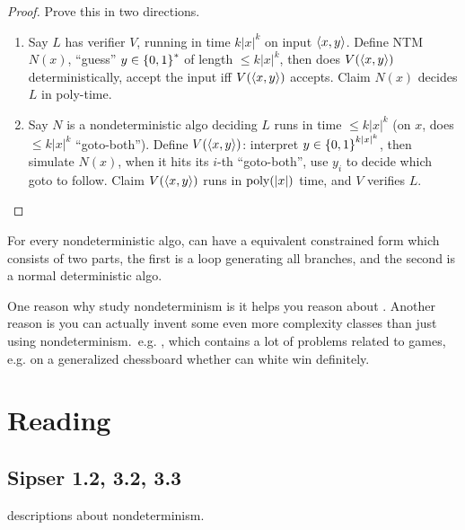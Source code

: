 \documentclass{article}
\begin{document}
\begin{proof}
  Prove this in two directions.
  \begin{enumerate}
    \item Say \(L\) has verifier \(V\), running in time \(k|x|^k\) on input \(\left\langle x, y \right\rangle\). Define NTM \(N(x)\), ``guess'' \(y \in \left\lbrace 0, 1 \right\rbrace^*\) of length \(\leq k|x|^k\), then does \(V(\left\langle x, y \right\rangle)\) deterministically, accept the input iff \(V(\left\langle x, y \right\rangle)\) accepts. Claim \(N(x)\) decides \(L\) in poly-time.
    \item Say \(N\) is a nondeterministic algo deciding \(L\) runs in time \(\leq k|x|^k\) (on \(x\), does \(\leq k|x|^k\) ``goto-both''). Define \(V(\left\langle x, y \right\rangle)\): interpret \(y \in \left\lbrace 0, 1 \right\rbrace^{k|x|^k}\), then simulate \(N(x)\), when it hits its \(i\)-th ``goto-both'', use \(y_i\) to decide which goto to follow. Claim \(V(\left\langle x, y \right\rangle)\) runs in \(\operatorname{poly}(|x|)\) time, and \(V\) verifies \(L\).
  \end{enumerate}
\end{proof}

For every nondeterministic algo, can have a equivalent constrained form which consists of two parts, the first is a loop generating all branches, and the second is a normal deterministic algo.

One reason why study nondeterminism is it helps you reason about \NP. Another reason is you can actually invent some even more complexity classes than just \NP using nondeterminism.\ e.g. \NEXP, which contains a lot of problems related to games, e.g. on a generalized chessboard whether can white win definitely.

\section{Reading}

\subsection{Sipser 1.2, 3.2, 3.3}

descriptions about nondeterminism.
\end{document}
